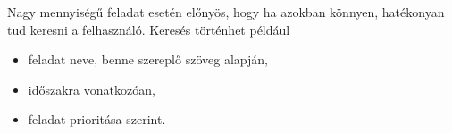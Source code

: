 






Nagy mennyiségű feladat esetén előnyös, hogy ha azokban könnyen, hatékonyan tud keresni a felhasználó. Keresés történhet például
\begin{itemize}
\item feladat neve, benne szereplő szöveg alapján,
\item időszakra vonatkozóan,
\item feladat prioritása szerint.
\end{itemize}
